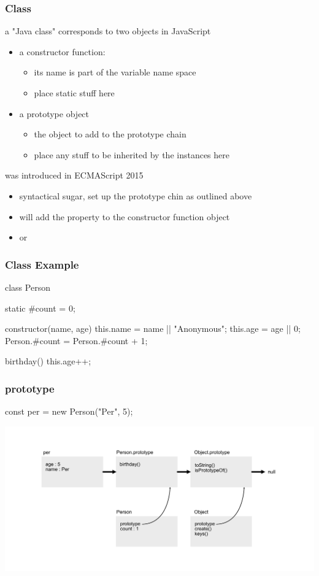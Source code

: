 \begin{frame}[fragile] \frametitle{Class}
a "Java class" corresponds to two objects in JavaScript
\begin{itemize}
  \item a constructor function:
  \begin{itemize}
    \item its name is part of the variable name space
    \item place static stuff here
  \end{itemize}
  \item a prototype object
  \begin{itemize}
    \item the object to add to the prototype chain
    \item place any stuff to be inherited by the instances here
  \end{itemize}
\end{itemize}
\vspace{5mm}

 was introduced in ECMAScript 2015
\begin{itemize}
  \item syntactical sugar, set up the prototype chin as outlined above
  \item {} will add the property to the constructor function object
  \item {} or 
\end{itemize}
\end{frame}
\begin{frame}[fragile] \frametitle{Class Example}
\begin{CodeBox}{}
class Person {
  static #count = 0;

  constructor(name, age) {
    this.name = name || "Anonymous";
    this.age = age || 0;
    Person.#count = Person.#count + 1;
  }

  birthday() {
    this.age++;
  }
}
\end{CodeBox}
\end{frame}

\begin{frame}[fragile] \frametitle{prototype}
\begin{CodeBox}{}
  const per = new Person("Per", 5);
\end{CodeBox}
  \centering
  \includegraphics[width=14cm]{img/prototype_chain6}
\end{frame}


